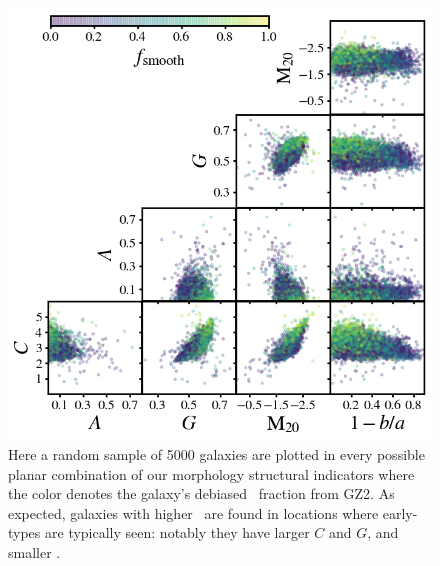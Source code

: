 
\begin{figure}
\centering
\includegraphics[width=5in]{Figures/morph_params_random_sample_fsmooth_colored_clean.png}
\caption[Automated morphologies as a function of Galaxy Zoo 2 \fsmooth]{Here a random sample of 5000 galaxies are plotted in every possible planar combination of our morphology structural indicators where the color denotes the galaxy's debiased \fsmooth~fraction from GZ2. As expected, galaxies with higher \fsmooth~are found in locations where early-types are typically seen: notably they have larger $C$ and $G$, and smaller .}
\label{fig: morphs as a fcn of fsmooth}
\end{figure}

